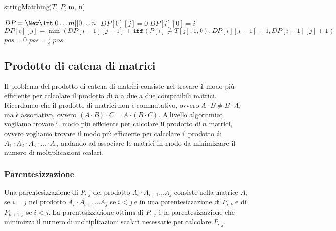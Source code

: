             \begin{algorithm}[H]
                \caption{\Int stringMatching(\Item[] $T$, \Item[] $P$, \Int m, \Int n)}
                \begin{algorithmic}
                    \State \Int[][] $DP = \New \Int[0\dots m][0\dots n]$
                        \State $DP[0][j]=0$
                    \EndFor
                        \State $DP[i][0]=i$
                    \EndFor
                            \State $DP[i][j] = \min\left( DP[i-1][j-1] + \texttt{iff}(P[i]\neq T[j], 1, 0), DP[i][j-1]+1, DP[i-1][j]+1\right)$
                        \EndFor
                    \EndFor
                    \State \Int $pos = 0$
                            \State $pos=j$
                        \EndIf
                    \EndFor
                    \State \Return $pos$
                \end{algorithmic}
            \end{algorithm}
    \subsection{Prodotto di catena di matrici}
        Il problema del prodotto di catena di matrici consiste nel trovare il modo più efficiente per calcolare il prodotto di $n$ a due a due compatibili matrici. Ricordando che il prodotto di matrici non è commutativo, ovvero $A\cdot B\neq B\cdot A$, ma è associativo, ovvero $(A\cdot B)\cdot C=A\cdot(B\cdot C)$.\newline
        A livello algoritmico vogliamo trovare il modo più efficiente per calcolare il prodotto di $n$ matrici, ovvero vogliamo trovare il modo più efficiente per calcolare il prodotto di $A_1\cdot A_2\cdot A_3\cdot\dots\cdot A_n$ andando ad associare le matrici in modo da minimizzare il numero di moltiplicazioni scalari.
        \subsubsection{Parentesizzazione}
            Una parentesizzazione di $P_{i,j}$ del prodotto $A_i\cdot A_{i+1}\dots A_j$ consiste nella matrice $A_i$ se $i=j$ nel prodotto $A_i\cdot A_{i+1}\dots A_j$ se $i<j$ e in una parentesizzazione di $P_{i,k}$ e di $P_{k+1,j}$ se $i<j$.
            La parentesizzazione ottima di $P_{i,j}$ è la parentesizzazione che minimizza il numero di moltiplicazioni scalari necessarie per calcolare $P_{i,j}$.

